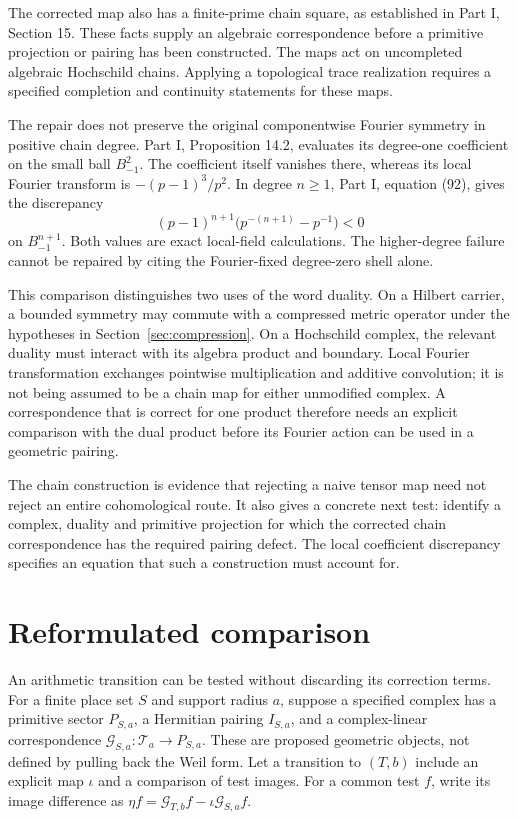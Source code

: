 \documentclass[11pt,letterpaper]{article}
\theoremstyle{definition}
\theoremstyle{remark}
\newcommand{\T}{\mathcal T}
\begin{document}
The corrected map also has a finite-prime chain square,
as established in Part I, Section 15. These facts supply
an algebraic correspondence before a primitive projection
or pairing has been constructed. The maps act on
uncompleted algebraic Hochschild chains. Applying a
topological trace realization requires a specified
completion and continuity statements for these maps.

The repair does not preserve the original componentwise
Fourier symmetry in positive chain degree. Part I,
Proposition 14.2, evaluates its degree-one coefficient
on the small ball $B_{-1}^2$. The coefficient itself
vanishes there, whereas its local Fourier transform is
$-(p-1)^3/p^2$. In degree $n\geq1$, Part I, equation (92),
gives the discrepancy
\[
 (p-1)^{n+1}\bigl(p^{-(n+1)}-p^{-1}\bigr)<0
\]
on $B_{-1}^{n+1}$. Both values are exact local-field
calculations. The higher-degree failure cannot be repaired
by citing the Fourier-fixed degree-zero shell alone.

This comparison distinguishes two uses of the word
duality. On a Hilbert carrier, a bounded symmetry may
commute with a compressed metric operator under the
hypotheses in Section~\ref{sec:compression}. On a
Hochschild complex, the relevant duality must interact
with its algebra product and boundary. Local Fourier
transformation exchanges pointwise multiplication and
additive convolution; it is not being assumed to be a
chain map for either unmodified complex. A correspondence
that is correct for one product therefore needs an
explicit comparison with the dual product before its
Fourier action can be used in a geometric pairing.

The chain construction is evidence that rejecting a
naive tensor map need not reject an entire cohomological
route. It also gives a concrete next test: identify a
complex, duality and primitive projection for which the
corrected chain correspondence has the required pairing
defect. The local coefficient discrepancy specifies an
equation that such a construction must account for.

\section{Reformulated comparison}
\label{sec:reformulation}

An arithmetic transition can be tested without discarding
its correction terms. For a finite place set $S$ and support
radius $a$, suppose a specified complex has a primitive
sector $P_{S,a}$, a Hermitian pairing $I_{S,a}$, and a
complex-linear correspondence
$\mathcal G_{S,a}:\T_a\to P_{S,a}$.
These are proposed geometric objects, not defined by
pulling back the Weil form. Let a transition to $(T,b)$
include an explicit map $\iota$ and a comparison of test
images. For a common test $f$, write its image difference
as $\eta f=\mathcal G_{T,b}f-\iota\mathcal G_{S,a}f$.
\end{document}
